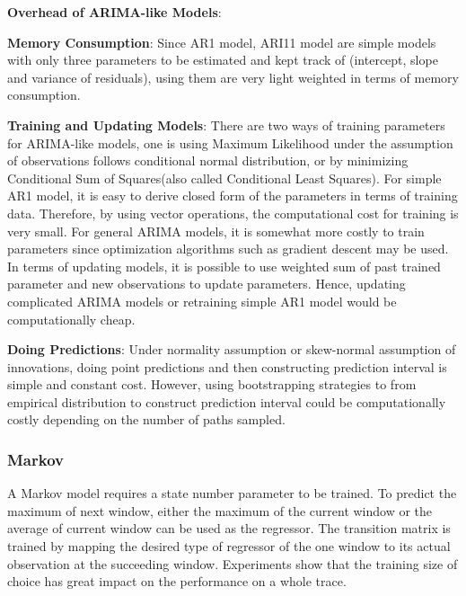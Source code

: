 \documentclass{article}
\begin{document}
\begin{flushleft}
\textbf{Overhead of ARIMA-like Models}:

\textbf{Memory Consumption}: Since AR1 model, ARI11 model are simple models with
only three parameters to be estimated and kept track of (intercept, slope and
variance of residuals), using them are very light weighted in terms of memory
consumption. 

\textbf{Training and Updating Models}: There are two ways of training parameters
for ARIMA-like models, one is using Maximum Likelihood under the assumption of
observations follows conditional normal distribution, or by minimizing
Conditional Sum of Squares(also called Conditional Least Squares). For simple
AR1 model, it is easy to derive closed form of the parameters in terms of
training data. Therefore, by using vector operations, the computational cost for
training is very small. For general ARIMA models, it is somewhat more costly to
train parameters since optimization algorithms such as gradient descent may be
used. In terms of updating models, it is possible to use weighted sum of past
trained parameter and new observations to update parameters. Hence, updating
complicated ARIMA models or retraining simple AR1 model would be computationally
cheap.

\textbf{Doing Predictions}: Under normality assumption or skew-normal assumption
of innovations, doing point predictions and then constructing prediction
interval is simple and constant cost. However, using bootstrapping strategies to
from empirical distribution to construct prediction interval could be
computationally costly depending on the number of paths sampled. 
\end{flushleft}

\subsubsection{Markov}

\begin{flushleft}
A Markov model requires a state number parameter to be trained. To predict the
maximum of next window, either the maximum of the current window or the average
of current window can be used as the regressor. The transition matrix is trained
by mapping the desired type of regressor of the one window to its actual
observation at the succeeding window. Experiments show that the training size of
choice has great impact on the performance on a whole trace.
\end{flushleft}
\end{document}
